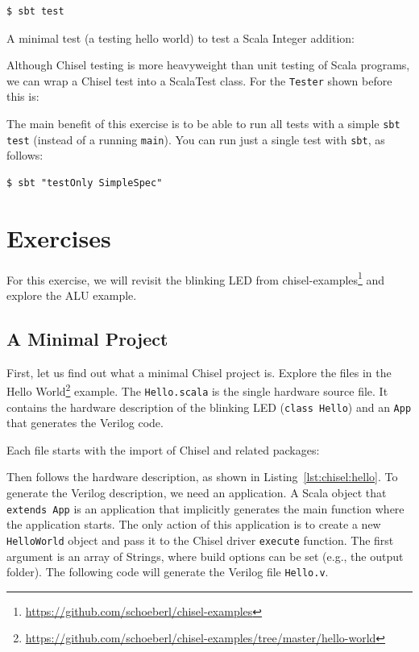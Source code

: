 \documentclass[%
    10pt,
    headinclude, footexclude,
    openright, %
    notitlepage,
    cleardoubleempty,
    headsepline,
    pointlessnumbers,
    bibtotoc, idxtotoc,
    ]{scrbook}
\newcommand{\code}[1]{{\small{\texttt{#1}}}}
\newcommand{\myref}[2]{\href{#1}{#2}}
\renewcommand{\myref}[2]{{#2}{\footnote{\url{#1}}}}
\begin{document}
\begin{verbatim}
$ sbt test
\end{verbatim}

\noindent A minimal test (a testing hello world) to test a Scala Integer
addition:


\noindent Although Chisel testing is more heavyweight than unit testing of Scala programs,
we can wrap a Chisel test into a ScalaTest class. For the \code{Tester} shown
before this is:


The main benefit of this exercise is to be able to run all tests with a simple
\code{sbt test} (instead of a running \code{main}). You can run just a single
test with \code{sbt}, as follows:

\begin{verbatim}
$ sbt "testOnly SimpleSpec"
\end{verbatim}

\section{Exercises}

For this exercise, we will revisit the blinking LED from
\myref{https://github.com/schoeberl/chisel-examples}{chisel-examples}
and explore the ALU example.

\subsection{A Minimal Project}

First, let us find out what a minimal Chisel project is. Explore the files in the
\myref{https://github.com/schoeberl/chisel-examples/tree/master/hello-world}{Hello World}
example.
The \code{Hello.scala} is the single hardware source file.
It contains the hardware description of the blinking LED (\code{class Hello})
and an \code{App} that generates the Verilog code.

Each file starts with the import of Chisel and related packages:


\noindent Then follows the hardware description, as shown in Listing~\ref{lst:chisel:hello}.
To generate the Verilog description, we need an application. A Scala object that \code{extends App}
is an application that implicitly generates the main function where the application starts.
The only action of this application is to create a new \code{HelloWorld} object and pass it
to the Chisel driver \code{execute} function. The first argument is an array of Strings,
where build options can be set (e.g., the output folder). The following code will
generate the Verilog file \code{Hello.v}.
\end{document}
